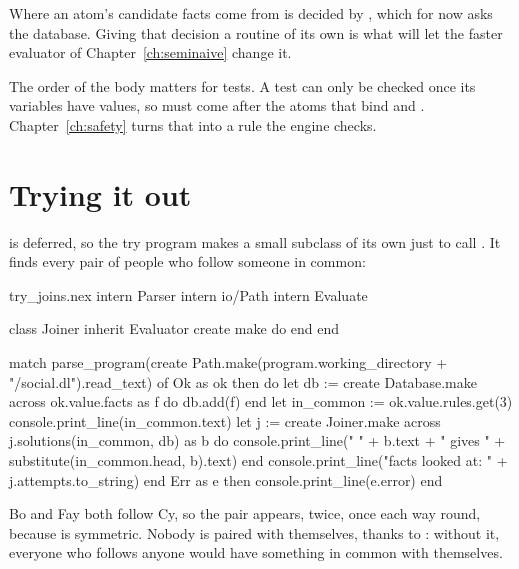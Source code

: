 Where an atom's candidate facts come from is decided by , which
for now asks the database. Giving that decision a routine of its own is
what will let the faster evaluator of Chapter~\ref{ch:seminaive} change it.

The order of the body matters for tests. A test can only be checked once its
variables have values, so  must come after the atoms that bind
 and . Chapter~\ref{ch:safety} turns that into a rule the
engine checks.

\section{Trying it out}

 is deferred, so the try program makes a small subclass of
its own just to call . It finds every pair of people who
follow someone in common:

\begin{tryit}{try_joins.nex}
intern Parser
intern io/Path
intern Evaluate

class Joiner inherit Evaluator
create
  make
  do
  end
end

match parse_program(create Path.make(program.working_directory + "/social.dl").read_text) of
  Ok as ok then
    do
      let db := create Database.make
      across ok.value.facts as f do
        db.add(f)
      end
      let in_common := ok.value.rules.get(3)
      console.print_line(in_common.text)
      let j := create Joiner.make
      across j.solutions(in_common, db) as b do
        console.print_line("  " + b.text + "   gives " + substitute(in_common.head, b).text)
      end
      console.print_line("facts looked at: " + j.attempts.to_string)
    end
  Err as e then console.print_line(e.error)
end
\end{tryit}

Bo and Fay both follow Cy, so the pair appears, twice, once each way round,
because  is symmetric. Nobody is paired with themselves,
thanks to : without it, everyone who follows anyone would have
something in common with themselves.
